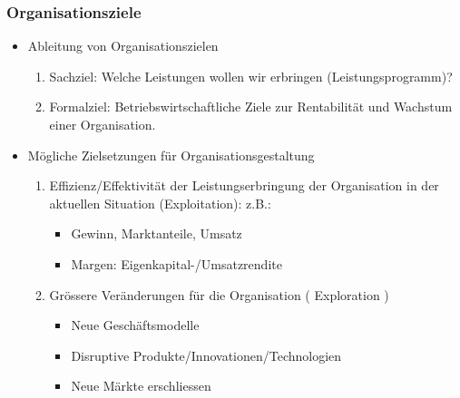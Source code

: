 \subsubsection{Organisationsziele}
\begin{itemize}
	\item Ableitung von Organisationszielen
	\begin{enumerate}
		\item Sachziel: Welche Leistungen wollen wir erbringen (Leistungsprogramm)?
		\item Formalziel: Betriebswirtschaftliche Ziele zur Rentabilität und Wachstum einer Organisation.
	\end{enumerate}
	\item  Mögliche Zielsetzungen für Organisationsgestaltung
	\begin{enumerate}
		\item Effizienz/Effektivität der Leistungserbringung der Organisation in der aktuellen Situation (Exploitation): z.B.:
		\begin{itemize}
			\item Gewinn, Marktanteile, Umsatz
			\item Margen: Eigenkapital-/Umsatzrendite
		\end{itemize}
		\item Grössere Veränderungen für die Organisation ( Exploration )
		\begin{itemize}
			\item Neue Geschäftsmodelle
			\item Disruptive Produkte/Innovationen/Technologien
			\item Neue Märkte erschliessen
		\end{itemize}
	\end{enumerate}
\end{itemize}

